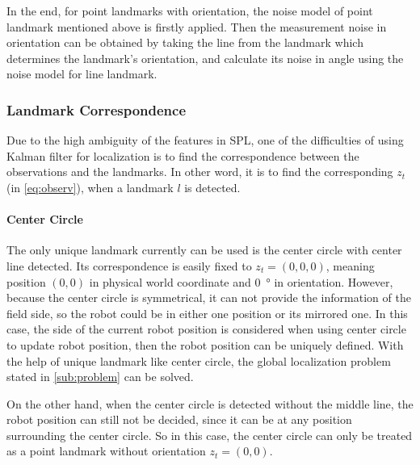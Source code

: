 In the end, for point landmarks with orientation, the noise model of point landmark mentioned above is firstly applied. Then the measurement noise in orientation can be obtained by taking the line from the landmark which determines the landmark's orientation, and calculate its noise in angle using the noise model for line landmark.


\subsubsection{Landmark Correspondence}\label{subsub:landmarkco}
Due to the high ambiguity of the features in \gls{SPL}, one of the difficulties of using Kalman filter for localization is to find the correspondence between the observations and the landmarks. In other word, it is to find the corresponding $z_t$ (in \autoref{eq:observ}), when a landmark $l$ is detected. 

\paragraph{Center Circle}
The only unique landmark currently can be used is the center circle with center line detected. Its correspondence is easily fixed to $z_t = (0,0,0)$, meaning position $(0,0)$ in physical world coordinate and \SI{0}{\degree} in orientation. However, because the center circle is symmetrical, it can not provide the information of the field side, so the robot could be in either one position or its mirrored one. In this case, the side of the current robot position is considered when using center circle to update robot position, then the robot position can be uniquely defined. With the help of unique landmark like center circle, the global localization problem stated in \autoref{sub:problem} can be solved.

On the other hand, when the center circle is detected without the middle line, the robot position can still not be decided, since it can be at any position surrounding the center circle. So in this case, the center circle can only be treated as a point landmark without orientation $z_t = (0,0)$.


